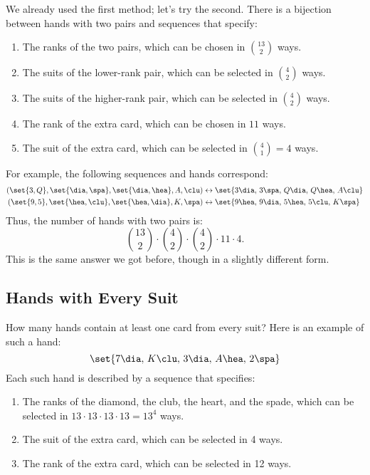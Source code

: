 We already used the first method; let's try the second.  There is a
bijection between hands with two pairs and sequences that specify:
%
\begin{enumerate}
\item The ranks of the two pairs, which can be chosen in $\binom{13}{2}$ ways.
\item The suits of the lower-rank pair, which can be selected in $\binom{4}{2}$ ways.
\item The suits of the higher-rank pair, which can be selected in $\binom{4}{2}$ ways.
\item The rank of the extra card, which can be chosen in $11$ ways.
\item The suit of the extra card, which can be selected in $\binom{4}{1} = 4$ ways.
\end{enumerate}
%
For example, the following sequences and hands correspond:
%
\begin{align*}
(\set{3, Q}, \set{\dia, \spa}, \set{\dia, \hea}, A, \clu)
    & \leftrightarrow
        \set{ 3 \dia, \, 3 \spa, \, Q \dia, \, Q \hea, \, A \clu } \\
(\set{9, 5}, \set{\hea, \clu}, \set{\hea, \dia}, K, \spa)
    & \leftrightarrow
        \set{ 9 \hea, \, 9 \dia, \, 5 \hea, \, 5 \clu, \, K \spa }
\end{align*}
%
Thus, the number of hands with two pairs is:
%
\[
\binom{13}{2} \cdot \binom{4}{2} \cdot \binom{4}{2} \cdot 11 \cdot 4.
\]
%
This is the same answer we got before, though in a slightly different
form.

\subsection{Hands with Every Suit}

How many hands contain at least one card from every suit?  Here is an
example of such a hand:
%
\begin{equation*}
\set{ 7 \dia,\,  K \clu, \, 3 \dia, \, A \hea, \, 2 \spa }
\end{equation*}
%
Each such hand is described by a sequence that specifies:

\begin{enumerate}

\item The ranks of the diamond, the club, the heart, and the spade,
which can be selected in $13 \cdot 13 \cdot 13 \cdot 13 = 13^4$ ways.

\item The suit of the extra card, which can be selected in 4 ways.

\item The rank of the extra card, which can be selected in 12 ways.

\end{enumerate}

